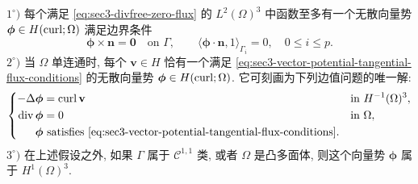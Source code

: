 \setcounter{statement}{5}
\begin{Theorem}\label{thm:sec3-tangential-zero-vector-potential}
$1^\circ)$ 每个满足 \eqref{eq:sec3-divfree-zero-flux} 的
$L^2(\Omega)^3$ 中函数至多有一个无散向量势
$\boldsymbol\phi\in H(\operatorname{curl};\Omega)$ 满足边界条件
\begin{equation}\label{eq:sec3-vector-potential-tangential-flux-conditions}
\boldsymbol\phi\times\mathbf n=\mathbf0\quad\text{on }\Gamma,
\qquad
\langle\boldsymbol\phi\cdot\mathbf n,1\rangle_{\Gamma_i}=0,
\quad0\le i\le p.
\end{equation}
$2^\circ)$ 当 $\Omega$ 单连通时, 每个 $\mathbf v\in H$ 恰有一个满足
\eqref{eq:sec3-vector-potential-tangential-flux-conditions} 的无散向量势
$\boldsymbol\phi\in H(\operatorname{curl};\Omega)$. 它可刻画为下列边值问题的唯一解:
\begin{equation}\label{eq:sec3-tangential-zero-potential-boundary-problem}
\left\{\begin{aligned}
-\Delta\boldsymbol\phi&=\operatorname{curl}\mathbf v&&\text{in }H^{-1}(\Omega)^3,\\
\operatorname{div}\boldsymbol\phi&=0&&\text{in }\Omega,\\
\boldsymbol\phi&\text{ satisfies }\eqref{eq:sec3-vector-potential-tangential-flux-conditions}.
\end{aligned}\right.
\end{equation}
$3^\circ)$ 在上述假设之外, 如果 $\Gamma$ 属于 $\mathcal C^{1,1}$ 类,
或者 $\Omega$ 是凸多面体, 则这个向量势 $\boldsymbol\phi$ 属于 $H^1(\Omega)^3$.
\end{Theorem}
